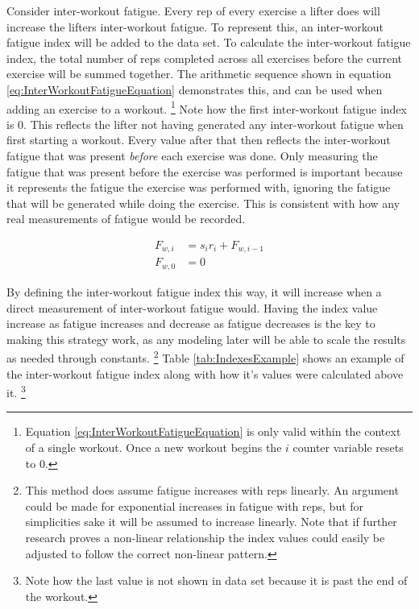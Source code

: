 Consider inter-workout fatigue. Every rep of every exercise a lifter does will increase the lifters inter-workout fatigue. To represent this, an inter-workout fatigue index will be added to the data set. To calculate the inter-workout fatigue index, the total number of reps completed across all exercises before the current exercise will be summed together. The arithmetic sequence shown in equation \ref{eq:InterWorkoutFatigueEquation} demonstrates this, and can be used when adding an exercise to a workout. \footnote{Equation \ref{eq:InterWorkoutFatigueEquation} is only valid within the context of a single workout. Once a new workout begins the $i$ counter variable resets to $0$.} Note how the first inter-workout fatigue index is $0$. This reflects the lifter not having generated any inter-workout fatigue when first starting a workout. Every value after that then reflects the inter-workout fatigue that was present \textit{before} each exercise was done. Only measuring the fatigue that was present before the exercise was performed is important because it represents the fatigue the exercise was performed with, ignoring the fatigue that will be generated while doing the exercise. This is consistent with how any real measurements of fatigue would be recorded.

\begin{equation}
	\label{eq:InterWorkoutFatigueEquation}
	\begin{split}
		F_{w,i} & = s_{i}r_{i}+F_{w,i-1} \\
		F_{w,0} & = 0
	\end{split}
\end{equation}


By defining the inter-workout fatigue index this way, it will increase when a direct measurement of inter-workout fatigue would. Having the index value increase as fatigue increases and decrease as fatigue decreases is the key to making this strategy work, as any modeling later will be able to scale the results as needed through constants. \footnote{This method does assume fatigue increases with reps linearly. An argument could be made for exponential increases in fatigue with reps, but for simplicities sake it will be assumed to increase linearly. Note that if further research proves a non-linear relationship the index values could easily be adjusted to follow the correct non-linear pattern.} Table \ref{tab:IndexesExample} shows an example of the inter-workout fatigue index along with how it's values were calculated above it. \footnote{Note how the last value is not shown in data set because it is past the end of the workout.}

